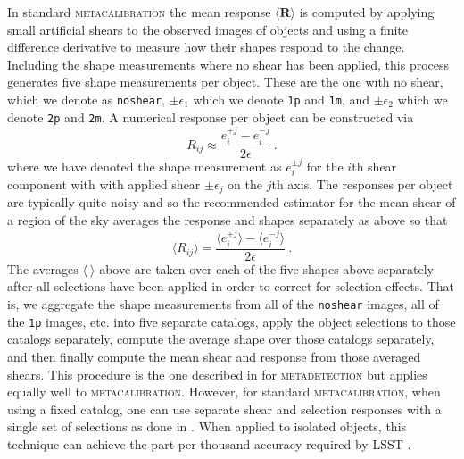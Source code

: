 \documentclass[twocolumn]{openjournal}
\makeatletter
\newcommand{\mdet}{\textsc{metadetection}\@\xspace}
\newcommand{\mcal}{\textsc{metacalibration}\@\xspace}
\newcommand{\noshear}{\texttt{noshear}\@\xspace}
\makeatother
\begin{document}
In standard \mcal the mean response $\langle \mathbf{R} \rangle$ is computed by applying
small artificial shears to the observed images of objects and using a finite difference
derivative to measure how their shapes respond to the change. Including the shape measurements where no
shear has been applied, this process generates five shape measurements per object. These
are the one with no shear, which we denote as \texttt{noshear},
$\pm\epsilon_1$ which we denote \texttt{1p} and \texttt{1m}, and
$\pm\epsilon_2$ which we denote \texttt{2p} and \texttt{2m}.
A numerical response per object can be constructed via
\begin{equation} \label{eq:standard_R}
R_{ij} \approx \frac{e_i^{+j} - e_i^{-j}}{2\epsilon}\ .
\end{equation}
where we have denoted the shape measurement as $e_i^{\pm j}$ for the $i$th shear
component with  with applied shear $\pm\epsilon_j$ on the $j$th axis. The responses per
object are typically quite noisy and so the recommended estimator for the mean shear of
a region of the sky averages the response and shapes separately as above so that
\begin{equation*}
\langle R_{ij} \rangle = \frac{\langle e_i^{+j} \rangle - \langle e_i^{-j} \rangle}{2\epsilon}\ .
\end{equation*}
The averages $\langle\ \rangle$ above are taken over each of the five shapes above
separately after all selections have been applied in order to correct for selection
effects. That is, we aggregate the shape measurements from all of the \noshear images,
all of the \texttt{1p} images, etc. into five separate catalogs, apply the object
selections to those catalogs separately, compute the average shape over those catalogs
separately, and then finally compute the mean shear and response from those averaged
shears. This procedure is the one described in \citet{SheldonMdet2020} for \mdet but
applies equally well to \mcal. However, for standard \mcal, when using a fixed
catalog, one can use separate shear and selection
responses with a single set of selections as done in \citet{SheldonMcal2017}. When
applied to isolated objects, this technique can achieve the part-per-thousand accuracy
required by LSST \citep{HuffMcal2017,SheldonMcal2017}.
\end{document}
